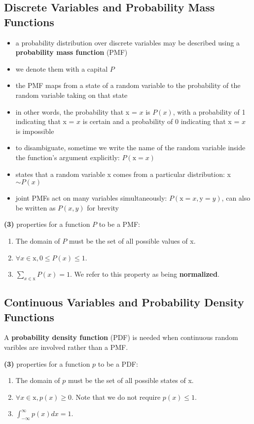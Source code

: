 \documentclass[11pt, twocolumn]{report}
\begin{document}
\subsection{Discrete Variables and Probability Mass Functions}
\begin{itemize}
  \item a probability distribution over discrete variables may be described
    using a \textbf{probability mass function} (PMF)
  \item we denote them with a capital $P$
  \item the PMF maps from a state of a random variable to the probability of
    the random variable taking on that state
  \item in other words, the probability that x = $x$ is $P(x)$, with a
    probability of 1 indicating that x = $x$ is certain and a probability of 0
    indicating that x = $x$ is impossible
  \item to disambiguate, sometime we write the name of the random variable
    inside the function's argument explicitly: $P(\text{x} = x)$
  \item states that a random variable x comes from a particular distribution: x
    $ \sim P(x)$
  \item joint PMFs act on many variables simultaneously: $P(\text{x} = x,
    \text{y} = y)$, can also be written as $P(x, y)$ for brevity
\end{itemize}
\textbf{(3)} properties for a function $P$ to be a PMF:
\begin{enumerate}
  \item The domain of $P$ must be the set of all possible values of x.
  \item $\forall x \in \text{x}, 0 \leq P(x) \leq 1$. 
  \item $\sum_{x \in \text{x}} P(x) = 1$. We refer to this property as being
    \textbf{normalized}.
\end{enumerate}

\subsection{Continuous Variables and Probability Density Functions}
A \textbf{probability density function} (PDF) is needed when continuous random
varibles are involved rather than a PMF. 

\textbf{(3)} properties for a function $p$ to be a PDF:
\begin{enumerate}
  \item The domain of $p$ must be the set of all possible states of x.
  \item $\forall x \in \text{x}, p(x) \geq 0$. Note that we do not require
    $p(x) \leq 1$.
  \item $\int_{-\infty}^{\infty} p(x)dx = 1$.
\end{enumerate}
\end{document}
